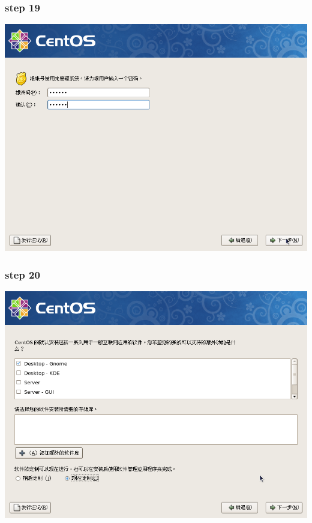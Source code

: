 \documentclass[xcolor=svgnames,presentation]{beamer}
\begin{document}
\begin{frame}
\frametitle{step 19}
\label{sec-2-19}

\begin{center}
\includegraphics[width=.9\linewidth]{img/img28.png}
\end{center}
\end{frame}
\begin{frame}
\frametitle{step 20}
\label{sec-2-20}

\begin{center}
\includegraphics[width=.9\linewidth]{img/img29.png}
\end{center}
\end{frame}
\end{document}
